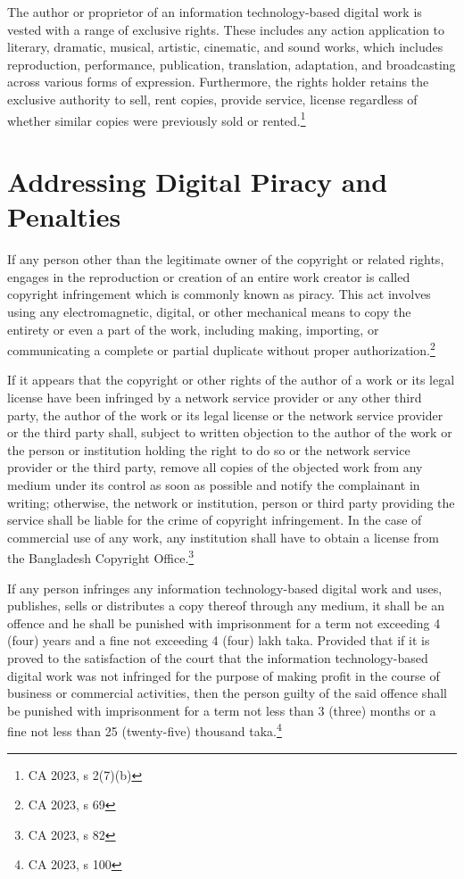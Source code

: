 \documentclass[10pt,letterpaper]{article}
\begin{document}
The author or proprietor of an information technology-based digital work is vested with a range of exclusive rights. These includes any action application to literary, dramatic, musical, artistic, cinematic, and sound works, which includes reproduction, performance, publication, translation, adaptation, and broadcasting across various forms of expression. Furthermore, the rights holder retains the exclusive authority to sell, rent copies, provide service, license regardless of whether similar copies were previously sold or rented.\footnote{CA 2023, s 2(7)(b)}


\section{Addressing Digital Piracy and Penalties}
If any person other than the legitimate owner of the copyright or related rights, engages in the reproduction or creation of an entire work creator is called copyright infringement which is commonly known as piracy. This act involves using any electromagnetic, digital, or other mechanical means to copy the entirety or even a part of the work, including making, importing, or communicating a complete or partial duplicate without proper authorization.\footnote{CA 2023, s 69}

If it appears that the copyright or other rights of the author of a work or its legal license have been infringed by a network service provider or any other third party, the author of the work or its legal license or the network service provider or the third party shall, subject to written objection to the author of the work or the person or institution holding the right to do so or the network service provider or the third party, remove all copies of the objected work from any medium under its control as soon as possible and notify the complainant in writing; otherwise, the network or institution, person or third party providing the service shall be liable for the crime of copyright infringement. In the case of commercial use of any work, any institution shall have to obtain a license from the Bangladesh Copyright Office.\footnote{CA 2023, s 82}

If any person infringes any information technology-based digital work and uses, publishes, sells or distributes a copy thereof through any medium, it shall be an offence and he shall be punished with imprisonment for a term not exceeding 4 (four) years and a fine not exceeding 4 (four) lakh taka. Provided that if it is proved to the satisfaction of the court that the information technology-based digital work was not infringed for the purpose of making profit in the course of business or commercial activities, then the person guilty of the said offence shall be punished with imprisonment for a term not less than 3 (three) months or a fine not less than 25 (twenty-five) thousand taka.\footnote{CA 2023, s 100}
\end{document}

